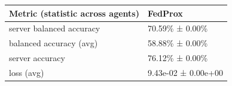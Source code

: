 \begin{tabular}{ll}
\hline
 Metric (statistic across agents)   & FedProx             \\
\hline
 server balanced accuracy           & 70.59\% ± 0.00\%      \\
 balanced accuracy (avg)            & 58.88\% ± 0.00\%      \\
 server accuracy                    & 76.12\% ± 0.00\%      \\
 loss (avg)                         & 9.43e-02 ± 0.00e+00 \\
\hline
\end{tabular}